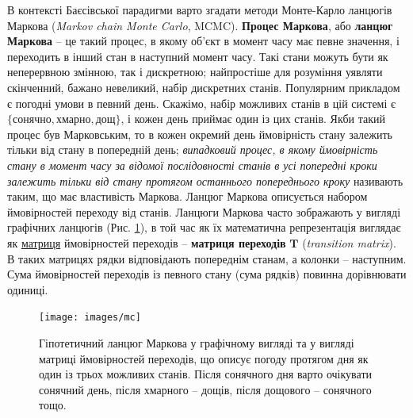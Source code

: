 \documentclass[
  11pt,
]{book}
\begin{document}
В контексті Баєсівської парадигми варто згадати методи Монте-Карло ланцюгів Маркова (\emph{Markov chain Monte Carlo}, MCMC). \textbf{Процес Маркова}, або \textbf{ланцюг Маркова} -- це такий процес, в якому об'єкт в момент часу має певне значення, і переходить в інший стан в наступний момент часу. Такі стани можуть бути як неперервною змінною, так і дискретною; найпростіше для розуміння уявляти скінченний, бажано невеликий, набір дискретних станів. Популярним прикладом є погодні умови в певний день. Скажімо, набір можливих станів в цій системі є \(\{\text{сонячно}, \text{хмарно}, \text{дощ}\}\), і кожен день приймає один із цих станів. Якби такий процес був Марковським, то в кожен окремий день ймовірність стану залежить тільки від стану в попередній день; \emph{випадковий процес, в якому ймовірність стану в момент часу за відомої послідовності станів в усі попередні кроки залежить тільки від стану протягом останнього попереднього кроку} називають таким, що має властивість Маркова. Ланцюг Маркова описується набором ймовірностей переходу від станів. Ланцюги Маркова часто зображають у вигляді графічних ланцюгів (Рис. \ref{fig:fig-3-13}), в той час як їх математична репрезентація виглядає як \hyperref[matrices]{матриця} ймовірностей переходів -- \textbf{матриця переходів} \(\mathbf{T}\) (\emph{transition matrix}). В таких матрицях рядки відповідають попереднім станам, а колонки -- наступним. Сума ймовірностей переходів із певного стану (сума рядків) повинна дорівнювати одиниці.

\begin{figure}
\texttt{[image: images/mc]} \caption{Гіпотетичний ланцюг Маркова у графічному вигляді та у вигляді матриці ймовірностей переходів, що описує погоду протягом дня як один із трьох можливих станів. Після сонячного дня варто очікувати сонячний день, після хмарного -- дощів, після дощового -- сонячного тощо.}\label{fig:fig-3-13}
\end{figure}
\end{document}
